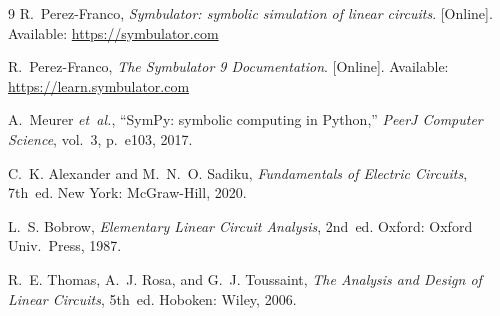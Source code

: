 \documentclass[11pt,oneside]{report}
\begin{document}
\begin{thebibliography}{9}
R.~Perez-Franco, \emph{Symbulator: symbolic simulation of linear
circuits}. [Online]. Available: \url{https://symbulator.com}

R.~Perez-Franco, \emph{The Symbulator 9 Documentation}. [Online].
Available: \url{https://learn.symbulator.com}

A.~Meurer \emph{et~al.}, ``SymPy: symbolic computing in Python,''
\emph{PeerJ Computer Science}, vol.~3, p.~e103, 2017.

C.~K. Alexander and M.~N.~O. Sadiku, \emph{Fundamentals of Electric
Circuits}, 7th~ed. New York: McGraw-Hill, 2020.

L.~S. Bobrow, \emph{Elementary Linear Circuit Analysis}, 2nd~ed.
Oxford: Oxford Univ.\ Press, 1987.

R.~E. Thomas, A.~J. Rosa, and G.~J. Toussaint, \emph{The Analysis and
Design of Linear Circuits}, 5th~ed. Hoboken: Wiley, 2006.

\end{thebibliography}
\end{document}
